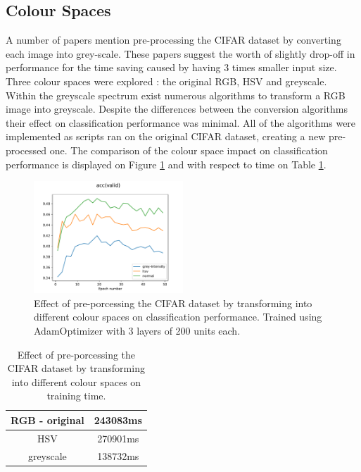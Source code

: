 \documentclass[12pt]{article}
\begin{document}
\subsection*{Colour Spaces}

A number of papers mention pre-processing the CIFAR dataset by converting each image into grey-scale\cite{grey1}\cite{grey2}. These papers suggest the worth of slightly drop-off in performance for the time saving caused by having 3 times smaller input size. Three colour spaces were explored : the original RGB, HSV and greyscale. Within the greyscale spectrum exist numerous algorithms to transform a RGB image into greyscale\cite{grey3}. Despite the differences between the conversion algorithms their effect on classification performance was minimal. All of the algorithms were implemented as scripts ran on the original CIFAR dataset, creating a new pre-processed one. The comparison of the colour space impact on classification performance is displayed on Figure \ref{fig:colour} and with respect to time on Table \ref{tab:colour}.

\begin{figure}[H]
\centering
\includegraphics[width=0.5\textwidth]{colour_comp.pdf}

  \caption{Effect of pre-porcessing the CIFAR dataset by transforming into different colour spaces on classification performance. Trained using AdamOptimizer with 3 layers of 200 units each.}
  \label{fig:colour}
\end{figure}

\begin{table}[H]
\centering
\begin{tabular}[h]{| c | c |}
\hline
RGB - original &   243083ms\\
\hline
HSV &   270901ms\\
\hline
greyscale &   138732ms \\
\hline
\end{tabular} 
\caption{Effect of pre-porcessing the CIFAR dataset by transforming into different colour spaces on training time.}
\label{tab:colour}
\end{table}
\end{document}
